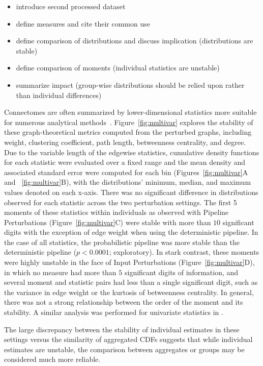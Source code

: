 \documentclass[fleqn,10pt]{SelfArx} %
\begin{document}
\begin{itemize}
\item introduce second processed dataset 
\item define measures and cite their common use
\item define comparison of distributions and discuss implication (distributions are stable)
\item define comparison of moments (individual statistics are unstable)
\item summarize impact (group-wise distributions should be relied upon rather than individual differences)
\end{itemize}

Connectomes are often summarized by lower-dimensional statistics more suitable for numerous analytical
methods~\cite{Rubinov2010-fh}. Figure~\ref{fig:multivar} explores the stability of these graph-theoretical metrics
computed from the perturbed graphs, including weight, clustering coefficient, path length, betweenness centrality, and
degree. Due to the variable length of the edgewise statistics, cumulative density functions for each statistic were
evaluated over a fixed range and the mean density and associated standard error were computed for each bin
(Figures~\ref{fig:multivar}A and ~\ref{fig:multivar}B), with the distributions' minimum, median, and maximum values
denoted on each x-axis. There was no significant difference in distributions observed for each statistic across the two
perturbation settings. The first 5 moments of these statistics within individuals as observed with Pipeline
Perturbations (Figure~\ref{fig:multivar}C) were stable with more than $10$ significant digits with the exception of
edge weight when using the deterministic pipeline. In the case of all statistics, the probabilistic pipeline was more
stable than the deterministic pipeline ($p < 0.0001$; exploratory). In stark contrast, these moments were highly
unstable in the face of Input Perturbations (Figure~\ref{fig:multivar}D), in which no measure had more than $5$
significant digits of information, and several moment and statistic pairs had less than a single significant digit,
such as the variance in edge weight or the kurtosis of betweenness centrality. In general, there was not a strong
relationship between the order of the moment and its stability. A similar analysis was performed for univariate
statistics in .

The large discrepancy between the stability of individual estimates in these settings versus the similarity of
aggregated CDFs suggests that while individual estimates are unstable, the comparison between aggregates or groups may
be considered much more reliable.
\end{document}
